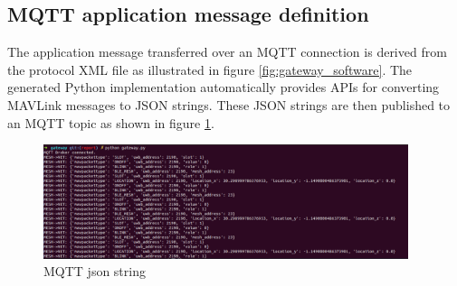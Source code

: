 \documentclass[\main/main.tex]{subfiles}
\begin{document}
\subsection{MQTT application message definition}
The application message transferred over an MQTT connection is derived from the protocol XML file as illustrated in figure \ref{fig:gateway_software}. The generated Python implementation automatically provides APIs for converting MAVLink messages to JSON strings.  These JSON strings are then published to an MQTT topic as shown in figure \ref{fig:mqtt_json_string}.

\begin{figure}[H]
    \begin{center}
        \includegraphics[width=0.95\textwidth]{mqtt_json_string.png}
    \end{center}
    \caption{MQTT json string}
    \label{fig:mqtt_json_string}
\end{figure}






\bib
\end{document}
